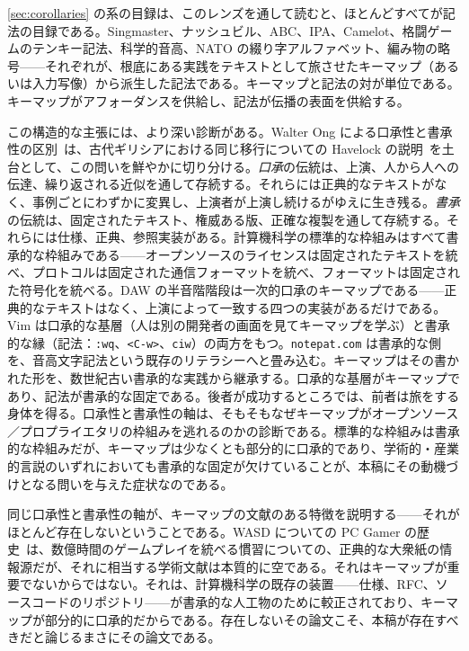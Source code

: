 \documentclass[10pt,letterpaper,twocolumn]{article}
\begin{document}
\textsection\ref{sec:corollaries} の系の目録は、このレンズを通して読むと、ほとんどすべてが記法の目録である。Singmaster、ナッシュビル、ABC、IPA、Camelot、格闘ゲームのテンキー記法、科学的音高、NATO の綴り字アルファベット、編み物の略号——それぞれが、根底にある実践をテキストとして旅させたキーマップ（あるいは入力写像）から派生した記法である。キーマップと記法の対が単位である。キーマップがアフォーダンスを供給し、記法が伝播の表面を供給する。

この構造的な主張には、より深い診断がある。Walter Ong による口承性と書承性の区別~\citep{ong1982orality}は、古代ギリシアにおける同じ移行についての Havelock の説明~\citep{havelock1963preface}を土台として、この問いを鮮やかに切り分ける。\emph{口承}の伝統は、上演、人から人への伝達、繰り返される近似を通して存続する。それらには正典的なテキストがなく、事例ごとにわずかに変異し、上演者が上演し続けるがゆえに生き残る。\emph{書承}の伝統は、固定されたテキスト、権威ある版、正確な複製を通して存続する。それらには仕様、正典、参照実装がある。計算機科学の標準的な枠組みはすべて書承的な枠組みである——オープンソースのライセンスは固定されたテキストを統べ、プロトコルは固定された通信フォーマットを統べ、フォーマットは固定された符号化を統べる。DAW の半音階階段は一次的口承のキーマップである——正典的なテキストはなく、上演によって一致する四つの実装があるだけである。Vim は口承的な基層（人は別の開発者の画面を見てキーマップを学ぶ）と書承的な縁（記法：\texttt{:wq}、\texttt{<C-w>}、\texttt{ciw}）の両方をもつ。\texttt{notepat.com} は書承的な側を、音高文字記法という既存のリテラシーへと畳み込む。キーマップはその書かれた形を、数世紀古い書承的な実践から継承する。口承的な基層がキーマップであり、記法が書承的な固定である。後者が成功するところでは、前者は旅をする身体を得る。口承性と書承性の軸は、そもそもなぜキーマップがオープンソース／プロプライエタリの枠組みを逃れるのかの診断である。標準的な枠組みは書承的な枠組みだが、キーマップは少なくとも部分的に口承的であり、学術的・産業的言説のいずれにおいても書承的な固定が欠けていることが、本稿にその動機づけとなる問いを与えた症状なのである。

同じ口承性と書承性の軸が、キーマップの文献のある特徴を説明する——それがほとんど存在しないということである。WASD についての PC Gamer の歴史~\citep{fenlon2016wasd}は、数億時間のゲームプレイを統べる慣習についての、正典的な大衆紙の情報源だが、それに相当する学術文献は本質的に空である。それはキーマップが重要でないからではない。それは、計算機科学の既存の装置——仕様、RFC、ソースコードのリポジトリ——が書承的な人工物のために較正されており、キーマップが部分的に口承的だからである。存在しないその論文こそ、本稿が存在すべきだと論じるまさにその論文である。
\end{document}
